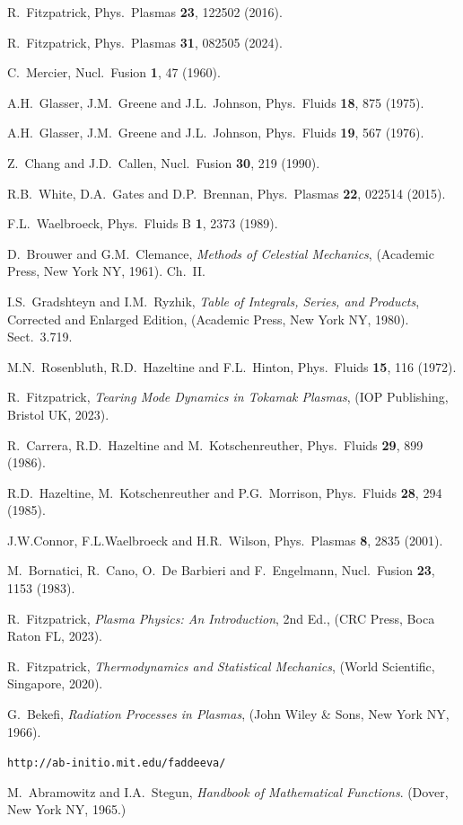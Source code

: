 \documentclass[12pt,prb,aps]{revtex4-1}
\begin{document}
\begin{thebibliography}{99}
 R.~Fitzpatrick, Phys.\ Plasmas {\bf 23}, 122502 (2016).

 R.~Fitzpatrick, Phys.\ Plasmas {\bf 31}, 082505 (2024).

 C.~Mercier, Nucl.\ Fusion {\bf 1}, 47 (1960).

 A.H.~Glasser, J.M.~Greene and J.L.~Johnson, Phys.\ Fluids {\bf 18}, 875 (1975).

 A.H.~Glasser, J.M.~Greene  and J.L.~Johnson, Phys.\ Fluids {\bf 19}, 567 (1976).

 Z.~Chang and J.D.~Callen,  Nucl.\ Fusion {\bf 30}, 219 (1990).

 R.B.~White, D.A.~Gates and D.P.~Brennan, Phys.\ Plasmas {\bf 22}, 022514 (2015). 

 F.L.~Waelbroeck, Phys.\ Fluids B {\bf 1}, 2373 (1989).

 D.~Brouwer and G.M.~Clemance, {\em Methods of Celestial Mechanics}, (Academic Press, New York NY, 1961).  Ch.~II.

 I.S.~Gradshteyn and I.M.~Ryzhik, {\em Table of Integrals, Series, and Products}, Corrected and Enlarged Edition, (Academic Press, New York NY, 1980). Sect.~3.719.

 M.N.~Rosenbluth, R.D.~Hazeltine and F.L.~Hinton, Phys.\ Fluids {\bf 15}, 116 (1972).

 R.~Fitzpatrick, {\em Tearing Mode Dynamics in Tokamak Plasmas}, (IOP Publishing, Bristol UK, 2023).

 R.~Carrera, R.D.~Hazeltine and M.~Kotschenreuther, Phys.\ Fluids {\bf 29}, 899 (1986). 

 R.D.~Hazeltine, M.~Kotschenreuther and P.G.~Morrison, Phys.\ Fluids {\bf 28}, 294 (1985). 

 J.W.Connor,  F.L.Waelbroeck and  H.R.~Wilson, Phys.\ Plasmas {\bf 8}, 2835 (2001). 

 M.~Bornatici, R.~Cano, O.\ De Barbieri and F.~Engelmann, Nucl.\ Fusion {\bf 23}, 1153 (1983).

 R.~Fitzpatrick, {\em Plasma Physics: An Introduction}, 2nd Ed., (CRC Press, Boca Raton FL, 2023).

 R.~Fitzpatrick, {\em Thermodynamics and Statistical Mechanics}, (World Scientific, Singapore,  2020).

 G.~Bekefi, {\em Radiation Processes in Plasmas}, (John Wiley \& Sons, New York NY, 1966).

 {\tt http://ab-initio.mit.edu/faddeeva/}

 M.~Abramowitz and I.A.~Stegun, {\em Handbook of Mathematical Functions}. (Dover, New York NY, 1965.)

\end{thebibliography}
\end{document}
